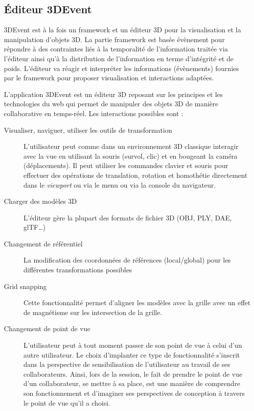 \subsection{Éditeur 3DEvent}
3DEvent est à la fois un \gls{framework} et un éditeur 3D pour la visualisation et la 
manipulation d'objets 3D. La partie \gls{framework} est basée évènement pour 
répondre à des contraintes liés à la temporalité de l'information traitée via l'éditeur 
ainsi qu'à la distribution de l'information en terme d'intégrité et de poids. L'éditeur 
va réagir et interpréter les informations (évènements) fournies par le 
\gls{framework} pour proposer visualisation et interactions adaptées.

 L'application 3DEvent est un 
éditeur 3D reposant sur les principes et les technologies du web qui permet de 
manipuler des objets 3D de manière 
collaborative en temps-réel. Les interactions possibles sont : 
\begin{description}
	
	\item[Visualiser, naviguer, utiliser les outils de transformation] L'utilisateur peut 
	com\-me dans un environnement 3D classique interagir avec la vue en utilisant 
	la souris (survol, clic) et en bougeant la caméra (déplacements). Il peut 
	utiliser les commandes clavier et souris pour effectuer des opérations de 
	translation, rotation et homothétie directement dans le \textit{viewport} ou via le 
	menu ou via la console du navigateur.
	\item[Charger des modèles 3D] L'éditeur gère la plupart des formats de fichier 
	3D (OBJ, PLY, DAE, glTF\ldots)
	\item[Changement de référentiel] La modification des coordonnées de 
	réfé\-ren\-ces (local/global)  pour les différentes transformations possibles
	\item[Grid snapping] Cette fonctionnalité permet d'aligner les modèles avec la 
	grille avec un effet de magnétisme sur les intersection de la grille.
	\item[Changement de point de vue] L'utilisateur peut à tout moment passer de 
	son point de vue à celui d'un autre utilisateur. Le choix d'implanter ce type de 
	fonctionnalité s'inscrit dans la perspective de sensibilisation de l'utilisateur au 
	travail de ses collaborateurs. Ainsi, lors de la session, le fait de prendre le 
	point de vue d'un collaborateur, se mettre à sa place, est une manière de 
	comprendre son fonctionnement et d'imaginer ses 
	perspectives de conception à travers le point de vue qu'il a choisi.
\end{description}


